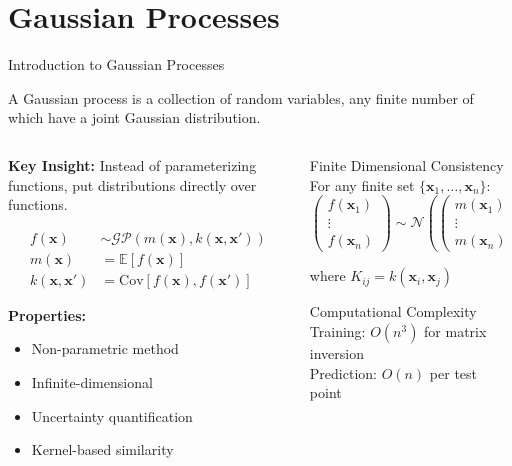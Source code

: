 \documentclass[aspectratio=169,11pt]{beamer}
\newcommand{\E}{\mathbb{E}}
\newcommand{\Cov}{\text{Cov}}
\newcommand{\Normal}{\mathcal{N}}
\newcommand{\GP}{\mathcal{GP}}
\newcommand{\bx}{\mathbf{x}}
\begin{document}
\section{Gaussian Processes}

\begin{frame}{Introduction to Gaussian Processes}
\begin{definition}
A Gaussian process is a collection of random variables, any finite number of which have a joint Gaussian distribution.
\end{definition}

\begin{columns}
\begin{column}{0.5\textwidth}
\textbf{Key Insight:} Instead of parameterizing functions, put distributions directly over functions.

\begin{align}
f(\bx) &\sim \GP(m(\bx), k(\bx, \bx'))\\
m(\bx) &= \E[f(\bx)]\\
k(\bx, \bx') &= \Cov[f(\bx), f(\bx')]
\end{align}

\textbf{Properties:}
\begin{itemize}
\item Non-parametric method
\item Infinite-dimensional
\item Uncertainty quantification
\item Kernel-based similarity
\end{itemize}
\end{column}
\begin{column}{0.5\textwidth}
\begin{block}{Finite Dimensional Consistency}
For any finite set $\{\bx_1, \ldots, \bx_n\}$:
\[\begin{pmatrix} f(\bx_1) \\ \vdots \\ f(\bx_n) \end{pmatrix} \sim \Normal\left(\begin{pmatrix} m(\bx_1) \\ \vdots \\ m(\bx_n) \end{pmatrix}, K\right)\]

where $K_{ij} = k(\bx_i, \bx_j)$
\end{block}

\begin{alertblock}{Computational Complexity}
Training: $O(n^3)$ for matrix inversion\\
Prediction: $O(n)$ per test point
\end{alertblock}
\end{column}
\end{columns}
\end{frame}
\end{document}
